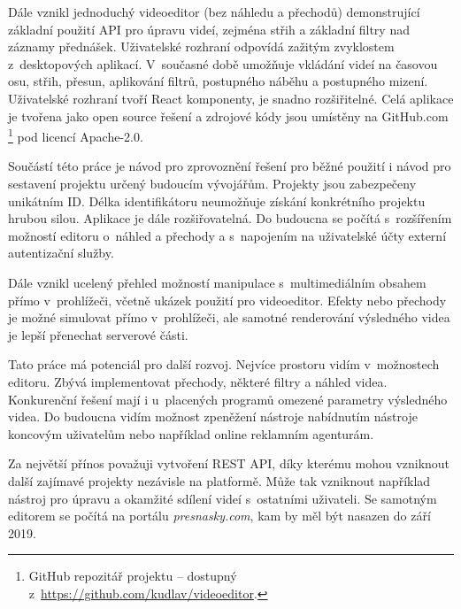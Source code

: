 Dále vznikl jednoduchý videoeditor (bez náhledu a přechodů) demonstrující základní použití API pro úpravu videí, zejména střih a základní filtry nad záznamy přednášek. Uživatelské rozhraní odpovídá zažitým zvyklostem z~desktopových aplikací. V~současné době umožňuje vkládání videí na časovou osu, střih, přesun, aplikování filtrů, postupného náběhu a postupného mizení. Uživatelské rozhraní tvoří React komponenty, je snadno rozšiřitelné. Celá aplikace je tvořena jako open source řešení a zdrojové kódy jsou umístěny na GitHub.com\,\footnote{GitHub repozitář projektu -- dostupný z~\url{https://github.com/kudlav/videoeditor}.} pod licencí Apache-2.0.

Součástí této práce je návod pro zprovoznění řešení pro běžné použití i návod pro sestavení projektu určený budoucím vývojářům. Projekty jsou zabezpečeny unikátním ID. Délka identifikátoru neumožňuje získání konkrétního projektu hrubou silou. Aplikace je dále rozšiřovatelná. Do budoucna se počítá s~rozšířením možností editoru o~náhled a přechody a s~napojením na uživatelské účty externí autentizační služby.

Dále vznikl ucelený přehled možností manipulace s~multimediálním obsahem přímo v~prohlížeči, včetně ukázek použití pro videoeditor. Efekty nebo přechody je možné simulovat přímo v~prohlížeči, ale samotné renderování výsledného videa je lepší přenechat serverové části.

Tato práce má potenciál pro další rozvoj. Nejvíce prostoru vidím v~možnostech editoru. Zbývá implementovat přechody, některé filtry a náhled videa. Konkurenční řešení mají i u~placených programů omezené parametry výsledného videa. Do budoucna vidím možnost zpeněžení nástroje nabídnutím nástroje koncovým uživatelům nebo například online reklamním agenturám.

Za největší přínos považuji vytvoření REST API, díky kterému mohou vzniknout další zajímavé projekty nezávisle na platformě. Může tak vzniknout například nástroj pro úpravu a okamžité sdílení videí s~ostatními uživateli. Se samotným editorem se počítá na portálu \textit{presnasky.com}, kam by měl být nasazen do září 2019.
